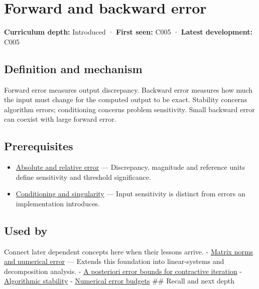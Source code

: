 \hypertarget{appendix-a7fbaf6d1b1c}{}\label{referencestart:appendix-a7fbaf6d1b1c}
\section{Forward and backward error}\label{appendix-a7fbaf6d1b1c-forward-and-backward-error}

\textbf{Curriculum depth:} Introduced · \textbf{First seen:} C005 · \textbf{Latest development:} C005

\subsection{Definition and mechanism}\label{appendix-a7fbaf6d1b1c-definition-and-mechanism}

Forward error measures output discrepancy. Backward error measures how much the input must change for the computed output to be exact. Stability concerns algorithm errors; conditioning concerns problem sensitivity. Small backward error can coexist with large forward error.

\subsection{Prerequisites}\label{appendix-a7fbaf6d1b1c-prerequisites}

\begin{itemize}
\tightlist
\item
  \hyperref[appendix-3ae74e89b4e6]{Absolute and relative error} --- Discrepancy, magnitude and reference units define sensitivity and threshold significance.
\item
  \hyperref[appendix-8f6a01f284a7]{Conditioning and singularity} --- Input sensitivity is distinct from errors an implementation introduces.
\end{itemize}

\subsection{Used by}\label{appendix-a7fbaf6d1b1c-used-by}

Connect later dependent concepts here when their lessons arrive. - \hyperref[appendix-f8657bac66e5]{Matrix norms and numerical error} --- Extends this foundation into linear-systems and decomposition analysis. - \hyperref[appendix-d83b0ad1be7f]{A posteriori error bounds for contractive iteration} - \hyperref[appendix-aa2bf0d79639]{Algorithmic stability} - \hyperref[appendix-31b8c295e05f]{Numerical error budgets} \#\# Recall and next depth

